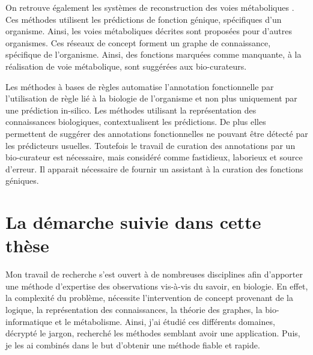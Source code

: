 On retrouve également les systèmes de reconstruction des voies métaboliques \citep[voir][]{karpe2011pathway}. Ces méthodes utilisent les prédictions de fonction génique, spécifiques d'un organisme. Ainsi, les voies métaboliques décrites sont proposées pour d'autres organismes. Ces réseaux de concept forment un graphe de connaissance, spécifique de l'organisme. Ainsi, des fonctions marquées comme manquante, à la réalisation de voie métabolique, sont suggérées aux bio-curateurs.

Les méthodes à bases de règles automatise l'annotation fonctionnelle par l'utilisation de règle lié à la biologie de l'organisme et non plus uniquement par une prédiction in-silico. Les méthodes utilisant la représentation des connaissances biologiques, contextualisent les prédictions. De plus elles permettent de suggérer des annotations fonctionnelles ne pouvant être détecté par les prédicteurs usuelles. Toutefois le travail de curation des annotations par un bio-curateur est nécessaire, mais considéré comme fastidieux, laborieux et source d'erreur. Il apparait nécessaire de fournir un assistant à la curation des fonctions géniques.



\section*{La démarche suivie dans cette thèse}

Mon travail de recherche s'est ouvert à de nombreuses disciplines afin d'apporter une méthode d'expertise des observations vis-à-vis du savoir, en biologie. En effet, la complexité du problème, nécessite l'intervention de concept provenant de la logique, la représentation des connaissances, la théorie des graphes, la bio-informatique et le métabolisme. Ainsi, j'ai étudié ces différents domaines, décrypté le jargon, recherché les méthodes semblant avoir une application. Puis, je les ai combinés dans le but d'obtenir une méthode fiable et rapide.


